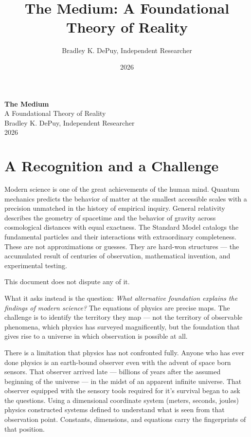 \documentclass[11pt,letterpaper]{article}
\author{Bradley K. DePuy, Independent Researcher}
\date{2026}
\title{The Medium: A Foundational Theory of Reality}
\begin{document}
\pagestyle{plain}
\begin{titlepage}
\vspace*{4cm}
\begin{center}
  {\LARGE\bfseries The Medium}\\[0.6em]
  {\large A Foundational Theory of Reality}\\[2.5em]
  {\normalsize Bradley K. DePuy, Independent Researcher}\\[0.5em]
  {\normalsize 2026}
\end{center}
\end{titlepage}

\pagestyle{plain}
\tableofcontents
\clearpage

\pagestyle{body}
\section{A Recognition and a Challenge}
\label{sec:orgce07d34}

Modern science is one of the great achievements of the human mind. Quantum mechanics predicts the behavior of matter at the smallest accessible scales with a precision unmatched in the history of empirical inquiry. General relativity describes the geometry of spacetime and the behavior of gravity across cosmological distances with equal exactness. The Standard Model catalogs the fundamental particles and their interactions with extraordinary completeness. These are not approximations or guesses. They are hard-won structures --- the accumulated result of centuries of observation, mathematical invention, and experimental testing.

This document does not dispute any of it.

What it asks instead is the question: \emph{What alternative foundation explains the findings of modern science?} The equations of physics are precise maps. The challenge is to identify the territory they map --- not the territory of observable phenomena, which physics has surveyed magnificently, but the foundation that gives rise to a universe in which observation is possible at all.

There is a limitation that physics has not confronted fully. Anyone who has ever done physics is an earth-bound observer even with the advent of space born sensors. That observer arrived late --- billions of years after the assumed beginning of the universe --- in the midst of an apparent infinite universe. That observer equipped with the sensory tools required for it's survival began to ask the questions. Using a dimensional coordinate system (meters, seconds, joules) physics constructed systems defined to understand what is seen from that observation point. Constants, dimensions, and equations carry the fingerprints of that position.
\end{document}
